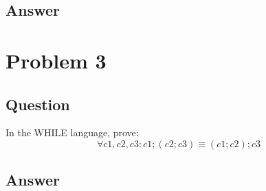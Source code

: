 \documentclass[a4paper, 11pt]{article}
\begin{document}
\subsection{Answer}

\section{Problem 3}

\subsection{Question}
In the WHILE language, prove:
$$\forall c1, c2, c3 : c1; (c2; c3) \equiv (c1; c2); c3$$

\subsection{Answer}
\end{document}
